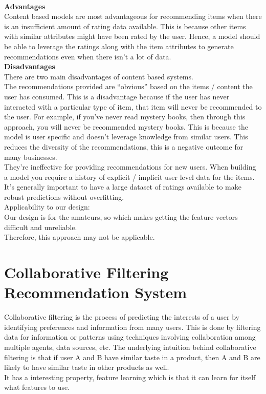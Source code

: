 \\\textbf{Advantages}
\\Content based models are most advantageous for recommending items when there is an insufficient amount of rating data available. This is because other items with similar attributes might have been rated by the user. Hence, a model should be able to leverage the ratings along with the item attributes to generate recommendations even when there isn’t a lot of data.
\\\textbf{Disadvantages}
\\There are two main disadvantages of content based systems.
\\The recommendations provided are “obvious” based on the items / content the user has consumed. This is a disadvantage because if the user has never interacted with a particular type of item, that item will never be recommended to the user. For example, if you’ve never read mystery books, then through this approach, you will never be recommended mystery books. This is because the model is user specific and doesn’t leverage knowledge from similar users. This reduces the diversity of the recommendations, this is a negative outcome for many businesses.
\\They’re ineffective for providing recommendations for new users. When building a model you require a history of explicit / implicit user level data for the items. It’s generally important to have a large dataset of ratings available to make robust predictions without overfitting.
\\Applicability to our design:
\\Our design is for the amateurs, so which makes getting the feature vectors difficult and unreliable. 
\\Therefore, this approach may not be applicable.





\section{Collaborative Filtering Recommendation System}
Collaborative filtering is the process of predicting the interests of a user by identifying preferences and information from many users. This is done by filtering data for information or patterns using techniques involving collaboration among multiple agents, data sources, etc. The underlying intuition behind collaborative filtering is that if user A and B have similar taste in a product, then A and B are likely to have similar taste in other products as well.
\\It has a interesting property, feature learning which is that it can learn for itself what features to use.

